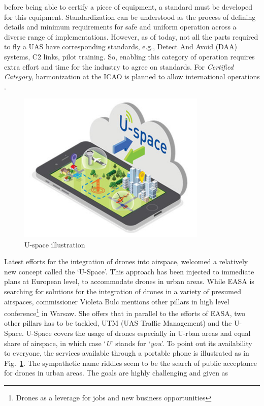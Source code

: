 \begin{itemize}
{before being able to certify a piece of equipment, a standard must be developed for this equipment. 
Standardization can be understood as the process of defining details and minimum requirements for safe and uniform operation across a diverse range of implementations. 
However, as of today, not all the parts required to fly a UAS have corresponding standards, e.g., Detect And Avoid (DAA) systems, C2 links, pilot training. 
So, enabling this category of operation requires extra effort and time for the industry to agree on standards. 
For \emph{Certified Category}, harmonization at the ICAO is planned to allow international operations \cite{manfredi2018unmanned}.}
\end{itemize}

\begin{figure}
\begin{center}
\includegraphics[width=9cm]{figures/USpacePortable}    %
\caption{U-space illustration \cite{UTMairspace}} 
\label{fig:USpacePortable}
\end{center}
\end{figure}

Latest efforts for the integration of drones into airspace, welcomed a relatively new concept called the `U-Space'. 
This approach has been injected to immediate plans at European level, to accommodate drones in urban areas. 
While EASA is searching for solutions for the integration of drones in a variety of presumed airspaces, commissioner Violeta Bulc mentions other pillars in high level conference\footnote{Drones as a leverage for jobs and new business opportunities} in Warsaw. 
She offers that in parallel to the efforts of EASA, two other pillars has to be tackled, UTM (UAS Traffic Management) and the U-Space.
U-Space covers the usage of drones especially in U-rban areas and equal share of airspace, in which case `\emph{U}' stands for `\emph{you}'.
To point out its availability to everyone, the services available through a portable phone is illustrated as in Fig.~\ref{fig:USpacePortable}.
The sympathetic name riddles seem to be the search of public acceptance for drones in urban areas.
The goals are highly challenging and given as \cite{UTMairspace}

